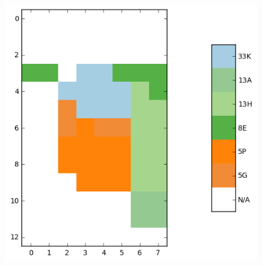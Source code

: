 \begin{figure}[!htb]
\begin{minipage}[c]{.33\linewidth}
  \end{minipage} \hfill
  \begin{minipage}[c]{.32\linewidth}
    \includegraphics[width=\linewidth]{figures/sample2_labels.png}
  \end{minipage}
  

\end{figure}
